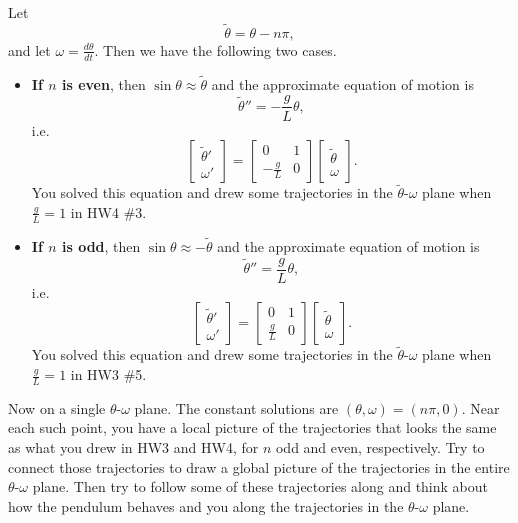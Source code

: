 \documentclass[11pt]{article}
\theoremstyle{definition}
\begin{document}
\begin{enumerate}[leftmargin=*]
Let 
\[
\tilde \theta= \theta -n\pi,
\]
and let $\omega=\frac{d\theta}{dt}$.
Then we have the following two cases.  

\begin{itemize}
\item \textbf{If $n$ is even}, then $\sin \theta\approx \tilde \theta$ and the approximate equation of motion is 
\[
\tilde \theta'' = -\frac{g}{L} \theta,
\]
i.e. 
\[
\left[ \begin{array}{c}\tilde  \theta' \\ \omega' \end{array}\right]= \left[ \begin{array}{cc} 0 & 1 \\ -\frac{g}{L} &0 \end{array}\right]\left[ \begin{array}{c}\tilde  \theta \\ \omega \end{array}\right].
\]
You solved this equation and drew some trajectories in the $\tilde \theta$-$\omega$ plane when $\frac{g}{L}=1$ in HW4 \#3.

\item  \textbf{If $n$ is odd}, then $\sin \theta\approx - \tilde \theta$ and the approximate equation of motion is 
\[
\tilde \theta'' = \frac{g}{L} \theta,
\]
i.e. 
\[
\left[ \begin{array}{c}\tilde  \theta' \\ \omega' \end{array}\right]= \left[ \begin{array}{cc} 0 & 1 \\ \frac{g}{L} &0 \end{array}\right]\left[ \begin{array}{c}\tilde  \theta \\ \omega \end{array}\right].
\]
You solved this equation and drew some trajectories in the $\tilde \theta$-$\omega$ plane when $\frac{g}{L}=1$ in HW3 \#5.
\end{itemize}
Now on a single $\theta$-$\omega$ plane.  The constant solutions are $(\theta,\omega)=(n\pi, 0)$.  Near each such point, you have a local picture of the trajectories that looks the same as what you drew in HW3 and HW4, for $n$ odd and even, respectively.  Try to connect those trajectories to draw a global picture of the trajectories in the entire $\theta$-$\omega$ plane.  Then try to follow some of these trajectories along and think about how the pendulum behaves and you along the trajectories in the $\theta$-$\omega$ plane.



\end{enumerate}
\end{document}
